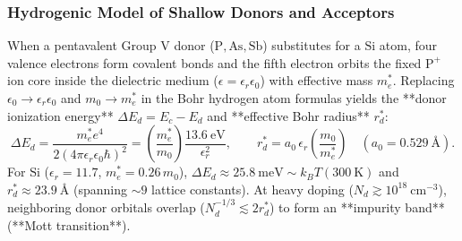 \documentclass[11pt,a4paper]{article}
\newcommand{\hb}{\hbar}
\begin{document}
\subsubsection{Hydrogenic Model of Shallow Donors and Acceptors}
When a pentavalent Group V donor ($\text{P}, \text{As}, \text{Sb}$) substitutes for a $\text{Si}$ atom, four valence electrons form covalent bonds and the fifth electron orbits the fixed $\text{P}^+$ ion core inside the dielectric medium ($\epsilon = \epsilon_r\epsilon_0$) with effective mass $m_e^*$. Replacing $\epsilon_0 \to \epsilon_r\epsilon_0$ and $m_0 \to m_e^*$ in the Bohr hydrogen atom formulas yields the **donor ionization energy** $\Delta E_d = E_c - E_d$ and **effective Bohr radius** $r_d^*$:
\begin{equation}
    \boxed{\Delta E_d = \frac{m_e^* e^4}{2(4\pi\epsilon_r\epsilon_0\hb)^2} = \left(\frac{m_e^*}{m_0}\right)\frac{13.6\ \mathrm{eV}}{\epsilon_r^2}, \qquad r_d^* = a_0\,\epsilon_r\left(\frac{m_0}{m_e^*}\right) \quad (a_0 = 0.529\ \text{\AA}).}
    \label{eq:hydrogenic_master}
\end{equation}
For $\text{Si}$ ($\epsilon_r = 11.7$, $m_e^* = 0.26\,m_0$), $\Delta E_d \approx 25.8\ \mathrm{meV} \sim k_B T(300\ \mathrm{K})$ and $r_d^* \approx 23.9\ \text{\AA}$ (spanning $\sim 9$ lattice constants). At heavy doping ($N_d \gtrsim 10^{18}\ \mathrm{cm^{-3}}$), neighboring donor orbitals overlap ($N_d^{-1/3} \lesssim 2r_d^*$) to form an **impurity band** (**Mott transition**).
\end{document}
